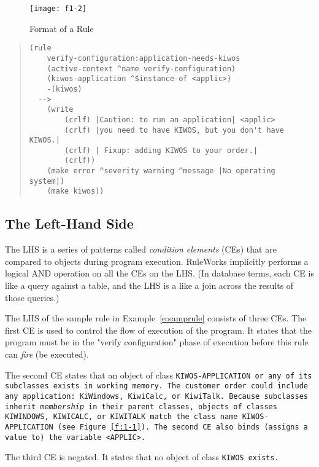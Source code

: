 \begin{figure}[h]
  \centering
  \texttt{[image: f1-2]}
  \caption{Format of a Rule}
  \label{f:1-2}
\end{figure}

\begin{example}[h]
\begin{quote}
\begin{verbatim}
(rule
    verify-configuration:application-needs-kiwos
    (active-context ^name verify-configuration)
    (kiwos-application ^$instance-of <applic>)
    -(kiwos)
  -->
    (write
        (crlf) |Caution: to run an application| <applic>
        (crlf) |you need to have KIWOS, but you don't have KIWOS.|
        (crlf) | Fixup: adding KIWOS to your order.|
        (crlf))
    (make error ^severity warning ^message |No operating system|)
    (make kiwos))
\end{verbatim}
\end{quote}
\caption{A Sample Rule}
\label{e:samprule}
\end{example}

\subsection{The Left-Hand Side}

The LHS is a series of patterns called \emph{condition elements} (CEs)
that are compared to objects during program execution.  RuleWorks
implicitly performs a logical AND operation on all the CEs on the
LHS. (In database terms, each CE is like a query against a table, and
the LHS is a like a join across the results of those queries.)

The LHS of the sample rule in Example~\ref{e:samprule} consists of
three CEs. The first CE is used to control the flow of execution of
the program. It states that the program must be in the "verify
configuration" phase of execution before this rule can \emph{fire} (be
executed).

The second CE states that an object of class \tt{KIWOS-APPLICATION} or
any of its subclasses exists in working memory. The customer order
could include any application: \tt{KiWindows}, \tt{KiwiCalc}, or
\tt{KiwiTalk}. Because subclasses inherit \emph{membership} in their
parent classes, objects of classes \tt{KIWINDOWS}, \tt{KIWICALC}, or
\tt{KIWITALK} match the class name \tt{KIWOS-APPLICATION} (see
Figure~\ref{f:1-1}). The second CE also binds (assigns a value to) the
variable \tt{<APPLIC>}.

The third CE is negated. It states that no object of class \tt{KIWOS}
exists.

